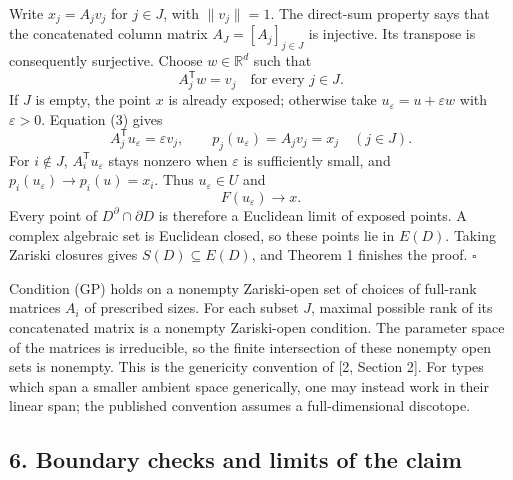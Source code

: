 \documentclass[
  11pt,
  letterpaper,
]{article}
\begin{document}
Write \(x_j=A_jv_j\) for \(j\in J\), with \(\|v_j\|=1\). The direct-sum
property says that the concatenated column matrix \(A_J=[A_j]_{j\in J}\)
is injective. Its transpose is consequently surjective. Choose
\(w\in\mathbb R^d\) such that \[
A_j^{\mathsf T}w=v_j\quad\text{for every }j\in J. \tag{3}
\] If \(J\) is empty, the point \(x\) is already exposed; otherwise take
\(u_\varepsilon=u+\varepsilon w\) with \(\varepsilon>0\). Equation (3)
gives \[
A_j^{\mathsf T}u_\varepsilon=\varepsilon v_j,
\qquad p_j(u_\varepsilon)=A_jv_j=x_j\quad(j\in J).
\] For \(i\notin J\), \(A_i^{\mathsf T}u_\varepsilon\) stays nonzero
when \(\varepsilon\) is sufficiently small, and
\(p_i(u_\varepsilon)\to p_i(u)=x_i\). Thus \(u_\varepsilon\in U\) and \[
F(u_\varepsilon)\longrightarrow x.
\] Every point of \(D^{\partial}\cap\partial D\) is therefore a
Euclidean limit of exposed points. A complex algebraic set is Euclidean
closed, so these points lie in \(E(D)\). Taking Zariski closures gives
\(S(D)\subseteq E(D)\), and Theorem 1 finishes the proof. \(\square\)

Condition (GP) holds on a nonempty Zariski-open set of choices of
full-rank matrices \(A_i\) of prescribed sizes. For each subset \(J\),
maximal possible rank of its concatenated matrix is a nonempty
Zariski-open condition. The parameter space of the matrices is
irreducible, so the finite intersection of these nonempty open sets is
nonempty. This is the genericity convention of {[}2, Section 2{]}. For
types which span a smaller ambient space generically, one may instead
work in their linear span; the published convention assumes a
full-dimensional discotope.

\subsection{6. Boundary checks and limits of the
claim}\label{boundary-checks-and-limits-of-the-claim}
\end{document}
